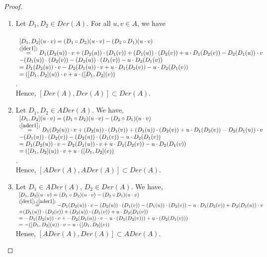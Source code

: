 \documentclass[12pt]{amsart}
\begin{document}
	\begin{proof}
		\begin{enumerate}
			\item  Let $ D_{1},D_{2}\in Der(A) $. For all $ u,v\in A $, we have\\\\
			$ \begin{array}{lll}
				[D_{1},D_{2}](u\cdot v)=(D_{1}\circ D_{2})(u\cdot v)-(D_{2}\circ D_{1})(u\cdot v)\\
				\overset{(\ref{der1})}{=}D_{1}(D_{2}(u))\cdot v+(D_{2}(u))\cdot(D_{1}(v))+(D_{1}(u))\cdot(D_{2}(v))+u\cdot D_{1}(D_{2}(v))-D_{2}(D_{1}(u))\cdot v\\
				-(D_{1}(u))\cdot(D_{2}(v))-(D_{2}(u))\cdot(D_{1}(v))-u\cdot D_{2}(D_{1}(v))\\
				=D_{1}(D_{2}(u))\cdot v-D_{2}(D_{1}(u))\cdot v+u\cdot D_{1}(D_{2}(v))-u\cdot D_{2}(D_{1}(v))\\
				=([D_{1},D_{2}](u))\cdot v+u\cdot([D_{1},D_{2}](v))
			\end{array} $.\\ 
			Hence, $[Der(A),Der(A)]\subset Der(A)$.
			\item Let $ D_{1},D_{2}\in ADer(A) $. We have, \\
			$ \begin{array}{lll}
				[D_{1},D_{2}](u\cdot v)=(D_{1}\circ D_{2})(u\cdot v)-(D_{2}\circ D_{1})(u\cdot v)\\
				\overset{(\ref{ader1})}{=}D_{1}(D_{2}(u))\cdot v+(D_{2}(u))\cdot(D_{1}(v))+(D_{1}(u))\cdot(D_{2}(v))+u\cdot D_{1}(D_{2}(v))-D_{2}(D_{1}(u))\cdot v\\
				-(D_{1}(u))\cdot(D_{2}(v))-(D_{2}(u))\cdot(D_{1}(v))-u\cdot D_{2}(D_{1}(v))\\
				=D_{1}(D_{2}(u))\cdot v-D_{2}(D_{1}(u))\cdot v+u\cdot D_{1}(D_{2}(v))-u\cdot D_{2}(D_{1}(v))\\
				=([D_{1},D_{2}](u))\cdot v+u\cdot([D_{1},D_{2}](v))	
			\end{array} $. \\
			Hence, $[ADer(A),ADer(A)]\subset Der(A)$.
			\item Let $ D_{1}\in ADer(A) $, $ D_{2}\in Der(A) $. We have, \\
			$ \begin{array}{lll}
				[D_{1},D_{2}](u\cdot v)=(D_{1}\circ D_{2})(u\cdot v)-(D_{2}\circ D_{1})(u\cdot v)\\
				\overset{(\ref{der1}),(\ref{ader1})}{=}-D_{1}(D_{2}(u))\cdot v-(D_{2}(u))\cdot(D_{1}(v))-(D_{1}(u))\cdot(D_{2}(v))-u\cdot D_{1}(D_{2}(v))+D_{2}(D_{1}(u))\cdot v\\
				+(D_{1}(u))\cdot(D_{2}(v))+(D_{2}(u))\cdot(D_{1}(v))+u\cdot D_{2}(D_{1}(v))\\
				=-D_{1}(D_{2}(u))\cdot v+-D_{2}(D_{1}(u))\cdot v-u\cdot(D_{1}(D_{2}(v)))+u\cdot(D_{2}(D_{1}(v)))\\
				=-([D_{1},D_{2}](u))\cdot v-u\cdot([D_{1},D_{2}](v))
			\end{array} $\\
			Hense, $[ADer(A),Der(A)]\subset ADer(A).$   
		\end{enumerate}
	\end{proof}
\end{document}
